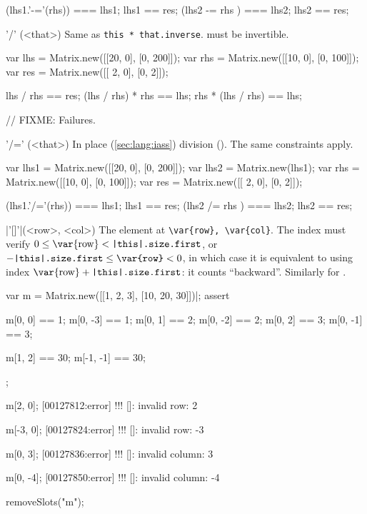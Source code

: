 \begin{urbiscriptapi}
\begin{urbiassert}
(lhs1.'-='(rhs)) === lhs1;  lhs1 == res;
(lhs2  -=  rhs ) === lhs2;  lhs2 == res;
\end{urbiassert}


\item['/'](<that>)%
  Same as \lstinline|this * that.inverse|.  \that must be invertible.
\begin{urbiassert}
var lhs = Matrix.new([[20, 0], [0, 200]]);
var rhs = Matrix.new([[10, 0], [0, 100]]);
var res = Matrix.new([[ 2, 0], [0,   2]]);

lhs / rhs == res;
(lhs / rhs) * rhs == lhs;
rhs * (lhs / rhs) == lhs;

// FIXME: Failures.
\end{urbiassert}


\item['/='](<that>)%
  In place (\autoref{sec:lang:iass}) division ().  The same
  constraints apply.
\begin{urbiassert}
var lhs1 = Matrix.new([[20, 0], [0, 200]]);
var lhs2 = Matrix.new(lhs1);
var rhs = Matrix.new([[10, 0], [0, 100]]);
var res = Matrix.new([[ 2, 0], [0,   2]]);

(lhs1.'/='(rhs)) === lhs1;  lhs1 == res;
(lhs2  /=  rhs ) === lhs2;  lhs2 == res;
\end{urbiassert}


\item|'[]'|(<row>, <col>)%
  The element at \lstinline|\var{row}, \var{col}|.  The index  must
  verify $0 \le \textrm{\var{row}} < \texttt{\this.size.first}$, or
  $-\texttt{\this.size.first} \le \texttt{\var{row}} < 0$, in which case it
  is equivalent to using index $\textrm{\var{row}} +
  \texttt{\this.size.first}$: it counts ``backward''.  Similarly for
  .
\begin{urbiscript}
var m = Matrix.new([[1, 2, 3], [10, 20, 30]])|;
assert
{
  m[0, 0] == 1;   m[0, -3] == 1;
  m[0, 1] == 2;   m[0, -2] == 2;
  m[0, 2] == 3;   m[0, -1] == 3;

  m[1, 2] == 30;  m[-1, -1] == 30;
};

m[2, 0];
[00127812:error] !!! []: invalid row: 2

m[-3, 0];
[00127824:error] !!! []: invalid row: -3

m[0, 3];
[00127836:error] !!! []: invalid column: 3

m[0, -4];
[00127850:error] !!! []: invalid column: -4
\end{urbiscript}
\begin{urbicomment}
  removeSlots("m");
\end{urbicomment}



\end{urbiscriptapi}
